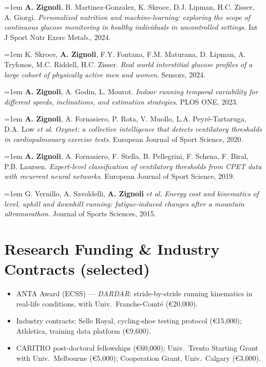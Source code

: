 \documentclass[10pt,a4paper]{article}
\newcommand{\pub}[3]{%
  \hangindent=1em\hangafter=1
  \small #1. \textit{#2}. #3.\par\vspace{3pt}%
}
\begin{document}
\pub{\textbf{A. Zignoli}, B. Martinez-Gonzalez, K. Skroce, D.J. Lipman, H.C. Zisser, A. Giorgi}{Personalized nutrition and machine-learning: exploring the scope of continuous glucose monitoring in healthy individuals in uncontrolled settings}{Int J Sport Nutr Exerc Metab., 2024}

\pub{K. Skroce, \textbf{A. Zignoli}, F.Y. Fontana, F.M. Maturana, D. Lipman, A. Tryfonos, M.C. Riddell, H.C. Zisser}{Real world interstitial glucose profiles of a large cohort of physically active men and women}{Sensors, 2024}

\pub{\textbf{A. Zignoli}, A. Godin, L. Mourot}{Indoor running temporal variability for different speeds, inclinations, and estimation strategies}{PLOS ONE, 2023}

\pub{\textbf{A. Zignoli}, A. Fornasiero, P. Rota, V. Muollo, L.A. Peyré-Tartaruga, D.A. Low \textit{et al}}{Oxynet: a collective intelligence that detects ventilatory thresholds in cardiopulmonary exercise tests}{European Journal of Sport Science, 2020}

\pub{\textbf{A. Zignoli}, A. Fornasiero, F. Stella, B. Pellegrini, F. Schena, F. Biral, P.B. Laursen}{Expert-level classification of ventilatory thresholds from CPET data with recurrent neural networks}{European Journal of Sport Science, 2019}

\pub{G. Vernillo, A. Savoldelli, \textbf{A. Zignoli} \textit{et al}}{Energy cost and kinematics of level, uphill and downhill running: fatigue-induced changes after a mountain ultramarathon}{Journal of Sports Sciences, 2015}

\section{Research Funding \& Industry Contracts (selected)}

\begin{itemize}
  \item ANTA Award (ECSS) — \textit{DARDAR}: stride-by-stride running kinematics in real-life conditions, with Univ.\ Franche-Comté (€20{,}000).
  \item Industry contracts: Selle Royal, cycling-shoe testing protocol (€15{,}000); Athletica, training data platform (€9{,}600).
  \item CARITRO post-doctoral fellowships (€60{,}000); Univ.\ Trento Starting Grant with Univ.\ Melbourne (€5{,}000); Cooperation Grant, Univ.\ Calgary (€3{,}000).
\end{itemize}
\end{document}
